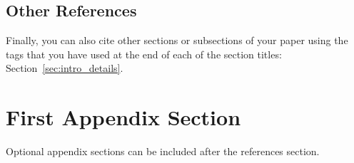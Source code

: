 \documentclass{anthology-ch}         %
\begin{document}
\subsection{Other References}

Finally, you can also cite other sections or subsections of your paper using
the tags that you have used at the end of each of the section titles:
Section~\ref{sec:intro_details}.

\printbibliography

\appendix

\section{First Appendix Section} \label{appdx:first}

Optional appendix sections can be included after the references section. 
\end{document}

